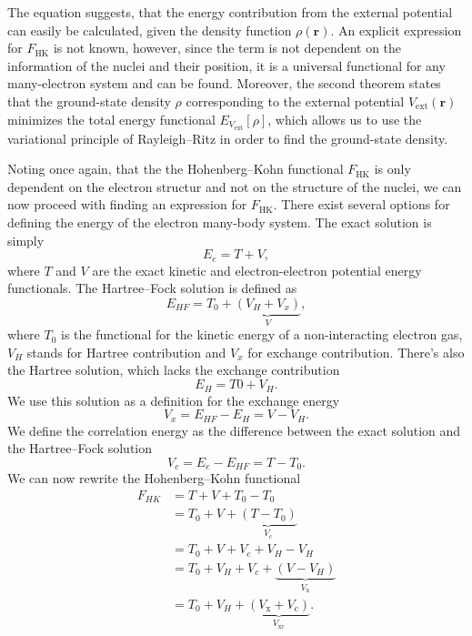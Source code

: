 The equation \label{eq:hk-2} suggests, that the energy contribution from the
external potential can easily be calculated, given the density function
$\rho(\mathbf{r})$. An explicit expression for $F_\mathrm{HK}$ is not known,
however, since the term is not dependent on the information of the nuclei and
their position, it is a universal functional for any many-electron system and
can be found. Moreover, the second theorem states that the ground-state
density $\rho$ corresponding to the external potential
$V_\mathrm{ext}(\mathbf{r})$ minimizes the total energy functional
$E_{V_\mathrm{ext}}[\rho]$, which allows us to use the variational principle
of Rayleigh--Ritz in order to find the ground-state density.

Noting once again, that the the Hohenberg--Kohn functional $F_\textrm{HK}$ is
only dependent on the electron structur and not on the structure of the
nuclei, we can now proceed with finding an expression for $F_\textrm{HK}$.
There exist several options for defining the energy of the electron many-body
system. The exact solution is simply
\begin{equation}
  E_e = T + V,
\end{equation}
where $T$ and $V$ are the exact kinetic and electron-electron potential energy
functionals. The Hartree--Fock solution is defined as
\begin{equation}
  E_{HF} = T_0 + \underbrace{(V_H + V_x)}_V,
\end{equation}
where $T_0$ is the functional for the kinetic energy of a non-interacting
electron gas, $V_H$ stands for Hartree contribution and $V_x$ for exchange
contribution. There's also the Hartree solution, which lacks the exchange
contribution
\begin{equation}
  E_H = T0 + V_H.
\end{equation}
We use this solution as a definition for the exchange energy
\begin{equation}
  V_x = E_{HF} - E_H = V - V_H.
\end{equation}
We define the correlation energy as the difference between the
exact solution and the Hartree--Fock solution
\begin{equation}
  V_c = E_e - E_{HF} = T - T_0.
\end{equation}
We can now rewrite the Hohenberg--Kohn functional
\begin{equation}
\begin{alignedat}{2}
  F_{HK} &= T + V + T_0 - T_0 \\
  &= T_0 + V + \underbrace{(T - T_0)}_{V_c} \\
  &= T_0 + V + V_c + V_H - V_H \\
  &= T_0 + V_H + V_c + \underbrace{(V - V_H)}_{V_\mathrm{x}} \\
  &= T_0 + V_H + \underbrace{(V_\mathrm{x} + V_\mathrm{c})}_{V_\mathrm{xc}}.
\end{alignedat}
\end{equation}
